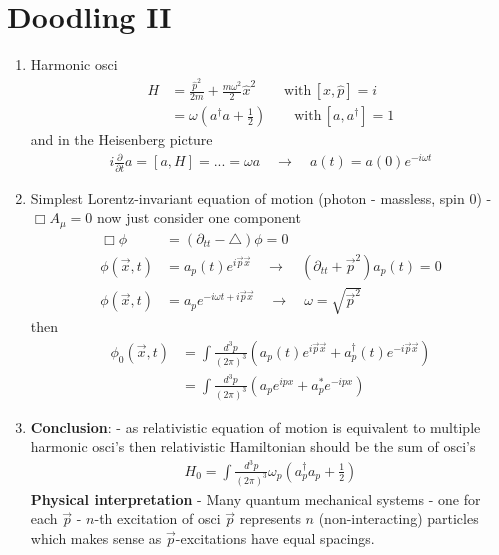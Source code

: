 \documentclass[10pt,a4paper]{book}
\theoremstyle{definition}
\begin{document}
\chapter{Doodling II}
\begin{enumerate}
\item Harmonic osci
\begin{align}
H&=\frac{\hat{p}^2}{2m}+\frac{m\omega^2}{2}\hat{x}^2\qquad\text{with}\,[\hat{x},\hat{p}]=i\\
&=\omega\left(a^\dagger a+\frac{1}{2}\right)\qquad\text{with}\,[a,a^\dagger]=1
\end{align}
and in the Heisenberg picture
\begin{align}
i\frac{\partial}{\partial t}a=[a,H]=...=\omega a\quad\rightarrow\quad a(t)=a(0)e^{-i\omega t}
\end{align}



\item Simplest Lorentz-invariant equation of motion (photon - massless, spin 0) - $\Box A_\mu=0$ now just consider one component
\begin{align}
\Box\phi&=(\partial_{tt}-\triangle)\phi=0\\
\phi(\vec{x},t)&=a_p(t)e^{i\vec{p}\vec{x}}\quad\rightarrow\quad(\partial_{tt}+\vec{p}^2)a_p(t)=0\\
\phi(\vec{x},t)&=a_pe^{-i\omega t+i\vec{p}\vec{x}}\quad\rightarrow\quad\omega=\sqrt{\vec{p}^2}
\end{align}
then
\begin{align}
\phi_0(\vec{x},t)
&=\int\frac{d^3p}{(2\pi)^3}\left(a_p(t)e^{i\vec{p}\vec{x}}+a_p^\dagger (t)e^{-i\vec{p}\vec{x}}\right)\\
&=\int\frac{d^3p}{(2\pi)^3}\left(a_pe^{ipx}+a_p^* e^{-ipx}\right)
\end{align}



\item {\bf Conclusion}: - as relativistic equation of motion is equivalent to multiple harmonic osci's then relativistic Hamiltonian should be the sum of osci's
\begin{align}
H_0=\int\frac{d^3p}{(2\pi)^3}\omega_p\left(a_p^\dagger a_p+\frac{1}{2}\right)
\end{align}
{\bf Physical interpretation} - Many quantum mechanical systems - one for each $\vec{p}$ -  $n$-th excitation of osci $\vec{p}$ represents $n$ (non-interacting) particles which makes sense as $\vec{p}$-excitations have equal spacings.


\end{enumerate}
\end{document}
